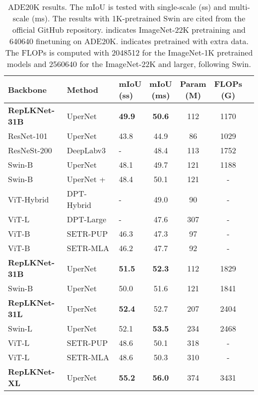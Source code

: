 \documentclass[10pt,twocolumn,letterpaper]{article}
\begin{document}
	
	\setlength{\tabcolsep}{2pt}
	\begin{table}
		\caption{ADE20K results. The mIoU is tested with single-scale (ss) and multi-scale (ms). The results with 1K-pretrained Swin are cited from the official GitHub repository.  indicates ImageNet-22K pretraining and 640640 finetuning on ADE20K.  indicates pretrained with extra data. The FLOPs is computed with 2048512 for the ImageNet-1K pretrained models and 2560640 for the ImageNet-22K and larger, following Swin.}
		\label{table-compare-ade20K}
		\vspace{-0.25in}
		\begin{center}		
			\small
			\begin{tabular}{lllcccc}
				\hline
					Backbone			&	Method		&		\makecell{mIoU \\ (ss)}	&	\makecell{mIoU \\ (ms)}	& 	\makecell{Param \\ (M)}	& \makecell{FLOPs \\ (G)}\\
				\hline
				\textbf{RepLKNet-31B}   	&	UperNet		&		\textbf{49.9}		&	\textbf{50.6}			&	112	&	1170\\   
				ResNet-101				&	UperNet \cite{xiao2018unified}			&	43.8	&	44.9		&	86		&	1029	\\
				ResNeSt-200~\cite{resnest}     &	DeepLabv3~\cite{chen2017rethinking}	&	-	&	48.4		&	113		&	1752	\\
				Swin-B	&	UperNet			&		48.1		&	49.7		&	121	&	1188	\\
				Swin-B           &	UperNet + \cite{gong2021improve}		&	48.4	&	50.1	&	121	&	-	\\
				ViT-Hybrid			&DPT-Hybrid~\cite{ranftl2021vision}				&		-			&	49.0		&	90		&	-	\\
				ViT-L				&	DPT-Large			&		-			&	47.6		&	307	&	-	\\
				ViT-B					&	SETR-PUP \cite{zheng2021rethinking}	&		46.3		&	47.3		&	97		&	-	\\
				ViT-B						&	SETR-MLA \cite{zheng2021rethinking}	&		46.2		&	47.7		&	92		&	-		\\
				\hline
				
				\textbf{RepLKNet-31B}~   	&	UperNet		&		\textbf{51.5}		&	\textbf{52.3}			&	112	&	1829\\
				Swin-B~	&	UperNet			&		50.0		&	51.6		&	121	&	1841	\\

				\textbf{RepLKNet-31L}~   	&	UperNet		&		\textbf{52.4}		&	52.7			&	207	&	2404\\	
				Swin-L~	&	UperNet			&		52.1		&	\textbf{53.5}		&	234	    &	2468	\\
				ViT-L~		&	SETR-PUP	&		48.6		&	50.1		&	318		&	-	\\
				ViT-L~		&	SETR-MLA	&		48.6		&	50.3		&	310		&	-		\\
				\hline
				\textbf{RepLKNet-XL}~ & UperNet & \textbf{55.2} & \textbf{56.0} & 374 & 3431 \\
				\hline
			\end{tabular}
		\end{center}
		\vspace{-0.3in}
	\end{table}
	
\end{document}
